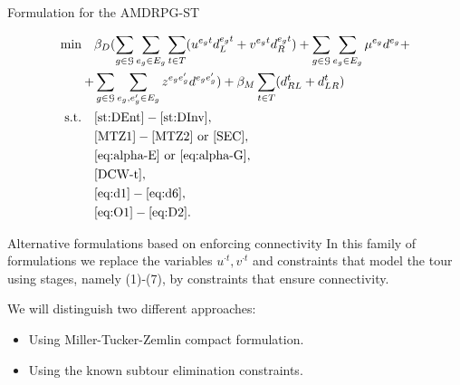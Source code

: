 \documentclass[slidestop,usepdftitle=false,10pt]{beamer}
\begin{document}
	\begin{frame}{Formulation for the AMDRPG-ST}
	
	\begin{align*}
	    \text{min}\quad & \beta_D(\sum_{g\in\mathcal G}\sum_{e_g\in E_g}\sum_{t\in T} (u^{e_gt}d_L^{e_gt} + v^{e_gt}d_R^{e_gt}) + \sum_{g\in\mathcal G}\sum_{e_g\in E_g} \mu^{e_g}d^{e_g} + \\
	    + & \sum_{g\in\mathcal G}\sum_{e_g,e^\prime_g\in E_g}z^{e_ge^\prime_g}d^{e_ge^\prime_g}) + \beta_M\sum_{t\in T} (d_{RL}^t + d_{LR}^t) \\
	    \text{s.t.}\quad & \eqref{st:DEnt}-\eqref{st:DInv}, \\
	    & \eqref{MTZ1} - \eqref{MTZ2} \text{ or } \eqref{SEC}, \\
	    & \eqref{eq:alpha-E} \text{ or } \eqref{eq:alpha-G}, \\
	    & \eqref{DCW-t}, \\
	    & \eqref{eq:d1}-\eqref{eq:d6}, \\
	    & \eqref{eq:O1}-\eqref{eq:D2}.
	\end{align*}
	    
	\end{frame}
	
	\begin{frame}{Alternative formulations based on enforcing connectivity}
	    In this family of formulations we replace the variables $u^{\cdot t}, v^{\cdot t}$ and constraints that model the tour using stages, namely (1)-(7), by constraints that ensure connectivity.
	    
	    \bigskip
	    
	    We will distinguish two different approaches:
    	\begin{itemize}
    		\item Using Miller-Tucker-Zemlin compact formulation.
    		\item Using the known subtour elimination constraints.
    	\end{itemize}
	\end{frame}
	
\end{document}
